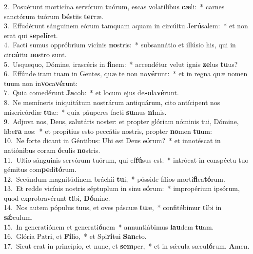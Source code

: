 {2.~}Posuérunt morticína servórum tuórum, escas volatílibus \textbf{cæ}li:~* carnes sanctórum tuórum \textbf{bé}stiis \textbf{ter}ræ.\\
{3.~}Effudérunt sánguinem eórum tamquam aquam in circúitu Je\textbf{rú}salem:~* et non erat qui \textbf{se}pe\textbf{lí}ret.\\
{4.~}Facti sumus oppróbrium vicínis \textbf{no}stris:~* subsannátio et illúsio his, qui in cir\textbf{cú}itu \textbf{no}stro sunt.\\
{5.~}Usquequo, Dómine, irascéris in \textbf{fi}nem:~* accendétur velut ignis \textbf{ze}lus \textbf{tu}us?\\
{6.~}Effúnde iram tuam in Gentes, quæ te non no\textbf{vé}runt:~* et in regna quæ nomen tuum non in\textbf{vo}ca\textbf{vé}runt:\\
{7.~}Quia comedérunt \textbf{Ja}cob:~* et locum ejus de\textbf{so}la\textbf{vé}runt.\\
{8.~}Ne memíneris iniquitátum nostrárum antiquárum, cito antícipent nos misericórdiæ \textbf{tu}æ:~* quia páuperes facti \textbf{su}mus \textbf{ni}mis.\\
{9.~}Adjuva nos, Deus, salutáris noster: et propter glóriam nóminis tui, Dómine, líbe\textbf{ra} nos:~* et propítius esto peccátis nostris, propter \textbf{no}men \textbf{tu}um:\\
{10.~}Ne forte dicant in Géntibus: Ubi est Deus e\textbf{ó}rum?~* et innotéscat in natiónibus coram \textbf{ó}culis \textbf{no}stris.\\
{11.~}Ultio sánguinis servórum tuórum, qui ef\textbf{fú}sus est:~* intróeat in conspéctu tuo gémitus com\textbf{pe}di\textbf{tó}rum.\\
{12.~}Secúndum magnitúdinem bráchii \textbf{tu}i,~* pósside fílios morti\textbf{fi}ca\textbf{tó}rum.\\
{13.~}Et redde vicínis nostris séptuplum in sinu e\textbf{ó}rum:~* impropérium ipsórum, quod exprobravérunt \textbf{ti}bi, \textbf{Dó}mine.\\
{14.~}Nos autem pópulus tuus, et oves páscuæ \textbf{tu}æ,~* confitébimur \textbf{ti}bi in \textbf{sǽ}culum.\\
{15.~}In generatiónem et generati\textbf{ó}nem~* annuntiábimus \textbf{lau}dem \textbf{tu}am.\\
{16.~}Glória Patri, et \textbf{Fí}lio,~* et Spi\textbf{rí}tui \textbf{San}cto.\\
{17.~}Sicut erat in princípio, et nunc, et \textbf{sem}per,~* et in sǽcula sæcu\textbf{ló}rum. \textbf{A}men.\\
